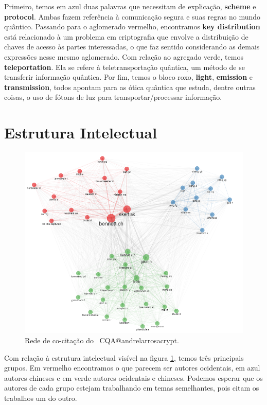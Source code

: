 Primeiro, temos em azul duas palavras que necessitam de explicação, \textbf{scheme} e \textbf{protocol}. Ambas fazem referência à comunicação segura e suas regras no mundo quântico. Passando para o aglomerado vermelho, encontramos \textbf{key distribution} está relacionado à um problema em criptografia que envolve a distribuição de chaves de acesso às partes interessadas, o que faz sentido considerando as demais expressões nesse mesmo aglomerado. Com relação ao agregado verde, temos \textbf{teleportation}. Ela se refere à teletransportação quântica, um método de se transferir informação quântica. Por fim, temos o bloco roxo, \textbf{light}, \textbf{emission} e \textbf{transmission}, todos apontam para as ótica quântica que estuda, dentre outras coisas, o uso de fótons de luz para transportar/processar informação.

\section{Estrutura Intelectual}

\begin{figure}
    \centering
    \includegraphics[angle=0,width=1\textwidth]{experiments/andrelarrosacrypt/AnaliseBibliometrica/CriptografiaQuantica/imagens/CQA@andrelarrosacrypt_CoCit.png}
    \caption{Rede de co-citação do \dataset\ CQA@andrelarrosacrypt.}
    \label{CQA@andrelarrosacrypt_CoCit}
\end{figure}

Com relação à estrutura intelectual visível na figura \ref{CQA@andrelarrosacrypt_CoCit}, temos três principais grupos. Em vermelho encontramos o que parecem ser autores ocidentais, em azul autores chineses e em verde autores ocidentais e chineses. Podemos esperar que os autores de cada grupo estejam trabalhando em temas semelhantes, pois citam os trabalhos um do outro.

